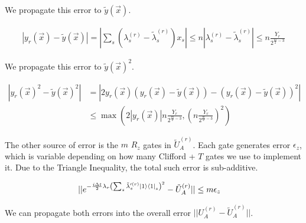 We propagate this error to $\tilde{y}(\vec{x})$.

\begin{equation}
    \begin{split}
        |y_r(\vec{x}) - \tilde{y}(\vec{x})| = |\sum_s (\lambda^{(r)}_s - \tilde{\lambda}^{(r)}_s)x_s| \leq n|\lambda^{(r)}_s - \tilde{\lambda}^{(r)}_s| \leq n\frac{Y_r}{2^{\frac{m}{2} - 3}}
    \end{split}
\end{equation}

We propagate this error to $\tilde{y}(\vec{x})^2$.

\begin{equation}
    \begin{split}
        |y_r(\vec{x})^2 - \tilde{y}(\vec{x})^2| &= |2y_r(\vec{x})(y_r(\vec{x}) - \tilde{y}(\vec{x})) - (y_r(\vec{x}) - \tilde{y}(\vec{x}))^2| \\
        &\leq \max\left(2|y_r(\vec{x})|n\frac{Y_r}{2^{\frac{m}{2} - 3}}, \left(n\frac{Y_r}{2^{\frac{m}{2} - 3}}\right)^2\right)
    \end{split}
\end{equation}

The other source of error is the $m$ $R_z$ gates in $\tilde{U}_A^{(r)}$. Each gate generates error $\epsilon_z$, which is variable depending on how many Clifford + $T$ gates we use to implement it. Due to the Triangle Inequality, the total such error is sub-additive.

\begin{equation}
    \begin{split}
        ||e^{-\frac{i\Delta t}{2}\lambda_r\left(\sum_s \tilde{\lambda}'^{(r)}_s \ket{1}\bra{1}_s\right)^2} - \tilde{U}_A^{(r)}|| &\leq m\epsilon_z
    \end{split}
\end{equation}

We can propagate both errors into the overall error $||U_A^{(r)} - \tilde{U}_A^{(r)}||$.

